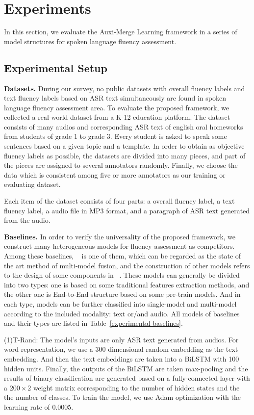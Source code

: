 
\section{Experiments}
In this section, we evaluate the Auxi-Merge Learning framework in a series of model structures for spoken language fluency assessment.

\subsection{Experimental Setup}
\textbf{Datasets.} During our survey, no public datasets with overall fluency labels and text fluency labels based on ASR text simultaneously are found in spoken language fluency assessment area.
To evaluate the proposed framework, we collected a real-world dataset from a K-12 education platform. 
The dataset consists of many audios and corresponding ASR text of english oral homeworks from students of grade 1 to grade 3. 
Every student is asked to speak some sentences based on a given topic and a template. 
In order to obtain as objective fluency labels as possible, the datasets are divided into many pieces, and part of the pieces are assigned to several annotators randomly. 
Finally, we choose the data which is consistent among five or more annotators as our training or evaluating dataset. 

Each item of the dataset consists of four parts: a overall fluency label, a text fluency label, a audio file in MP3 format, and a paragraph of ASR text generated from the audio.

\textbf{Baselines.} In order to verify the universality of the proposed framework, we construct many heterogeneous models for fluency assessment as competitors. Among these baselines, ~\cite{didi} is one of them, which can be regarded as the state of the art method of multi-model fusion, and the construction of other models refers to the design of some components in ~\cite{didi}. These models can generally be divided into two types: one is based on some traditional features extraction methods, and the other one is End-to-End  structure based on some pre-train models. And in each type, models can be further classified into single-model and multi-model according to the included modality: text or/and audio. All models of baselines and their types are listed in Table~\ref{experimental-baselines}. 

(1)T-Rand: The model's inputs are only ASR text generated from audios. For word representation, we use a 300-dimensional random embedding as the text embedding. And then the text embeddings are taken into a BiLSTM with 100 hidden units. Finally, the outputs of the BiLSTM are taken max-pooling and the results of binary classification are generated based on a fully-connected layer with a $200\times2$ weight matrix corresponding to the number of hidden states and the the number of classes. To train the model, we use Adam optimization with the learning rate of 0.0005.

